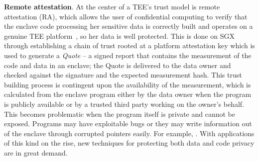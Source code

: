 \vspace{3pt}\noindent\textbf{Remote attestation}. At the center of a TEE's trust model is remote attestation (RA), which allows the user of confidential computing to verify that the enclave code processing her sensitive data is correctly built and operates on a genuine TEE platform~\cite{zhang2017presence}, so her data is well protected. This is done on SGX through establishing a chain of trust rooted at a platform attestation key 
which is used to generate a \textit{Quote} -- a signed report that contains the measurement of the code and data in an enclave; the Quote is delivered to the data owner and checked against the signature and the expected measurement hash. This trust building process is contingent upon the availability of the measurement, which is calculated from the enclave program either by the data owner when the program is publicly available or by a trusted third party working on the owner's behalf. This becomes problematic when the program itself is private and cannot be exposed.
Programs may have exploitable bugs or they may write information out of the enclave through corrupted pointers easily.
For example, \DIFdelbegin {}\DIFdelend \DIFaddbegin {}\textit{}\DIFaddend . With applications of this kind on the rise, new techniques for protecting both data and code privacy are in great demand.  

